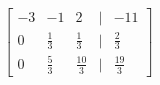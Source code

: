 \documentclass[preview]{standalone}
\begin{document}
\begin{align*}
\begin{bmatrix} -3 & -1 & 2 & | & -11 \\ 0 & \frac{1}{3} & \frac{1}{3} & | & \frac{2}{3} \\ 0 & \frac{5}{3} & \frac{10}{3} & | & \frac{19}{3} \end{bmatrix}
\end{align*}
\end{document}
